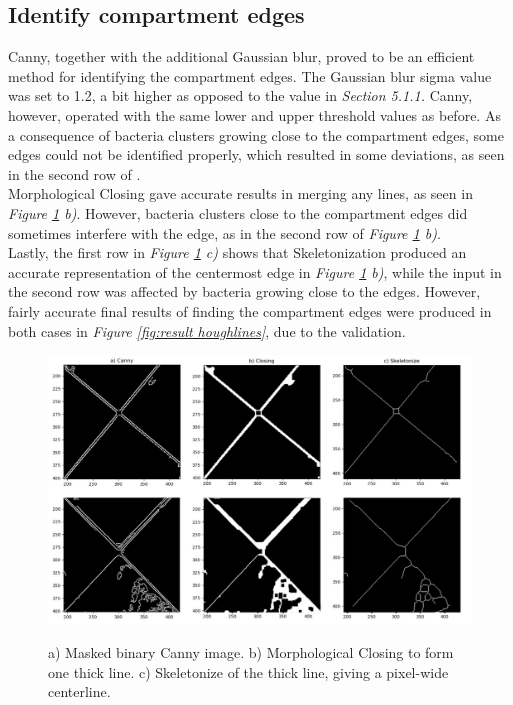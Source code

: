 \subsection{Identify compartment edges}
Canny, together with the additional Gaussian blur, proved to be an efficient method for identifying the compartment edges. The Gaussian blur sigma value was set to 1.2, a bit higher as opposed to the value in \textit{Section 5.1.1.} Canny, however, operated with the same lower and upper threshold values as before. As a consequence of bacteria clusters growing close to the compartment edges, some edges could not be identified properly, which resulted in some deviations, as seen in the second row of .\\

\noindent Morphological Closing gave accurate results in merging any lines, as seen in \textit{Figure \ref{fig:result skeletonize} b)}. However, bacteria clusters close to the compartment edges did sometimes interfere with the edge, as in the second row of \textit{Figure \ref{fig:result skeletonize} b)}. \\

\noindent Lastly, the first row in \textit{Figure \ref{fig:result skeletonize} c)} shows that Skeletonization produced an accurate representation of the centermost edge in \textit{Figure \ref{fig:result skeletonize} b)}, while the input in the second row was affected by bacteria growing close to the edges. However, fairly accurate final results of finding the compartment edges were produced in both cases in \textit{Figure \ref{fig:result houghlines}}, due to the validation.


\begin{figure}[H]
    \centering
      \includegraphics[width=1\linewidth]{figures/PDF/Skeletonize_double.pdf}\\
    \caption{a) Masked binary Canny image. b) Morphological Closing to form one thick line. c) Skeletonize of the thick line, giving a pixel-wide centerline.}
    \label{fig:result skeletonize}
\end{figure}



